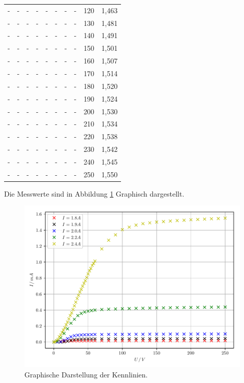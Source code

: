 \begin{table}[H]
\begin{tabular}{c c c c c c c c c c}
 -  &   -   &  -  &   -   &  -  &   -   &  -  &   -   & 120 & 1,463 \\
 -  &   -   &  -  &   -   &  -  &   -   &  -  &   -   & 130 & 1,481 \\
 -  &   -   &  -  &   -   &  -  &   -   &  -  &   -   & 140 & 1,491 \\
 -  &   -   &  -  &   -   &  -  &   -   &  -  &   -   & 150 & 1,501 \\
 -  &   -   &  -  &   -   &  -  &   -   &  -  &   -   & 160 & 1,507 \\
 -  &   -   &  -  &   -   &  -  &   -   &  -  &   -   & 170 & 1,514 \\
 -  &   -   &  -  &   -   &  -  &   -   &  -  &   -   & 180 & 1,520 \\
 -  &   -   &  -  &   -   &  -  &   -   &  -  &   -   & 190 & 1,524 \\
 -  &   -   &  -  &   -   &  -  &   -   &  -  &   -   & 200 & 1,530 \\
 -  &   -   &  -  &   -   &  -  &   -   &  -  &   -   & 210 & 1,534 \\
 -  &   -   &  -  &   -   &  -  &   -   &  -  &   -   & 220 & 1,538 \\
 -  &   -   &  -  &   -   &  -  &   -   &  -  &   -   & 230 & 1,542 \\
 -  &   -   &  -  &   -   &  -  &   -   &  -  &   -   & 240 & 1,545 \\
 -  &   -   &  -  &   -   &  -  &   -   &  -  &   -   & 250 & 1,550 \\
\bottomrule
  \end{tabular}
\end{table}

Die Messwerte sind in Abbildung \ref{abb:6} Graphisch dargestellt.

\begin{figure}[H]
  \centering
  \includegraphics{plot1.pdf}
  \caption{Graphische Darstellung der Kennlinien.}
  \label{abb:6}
\end{figure}

